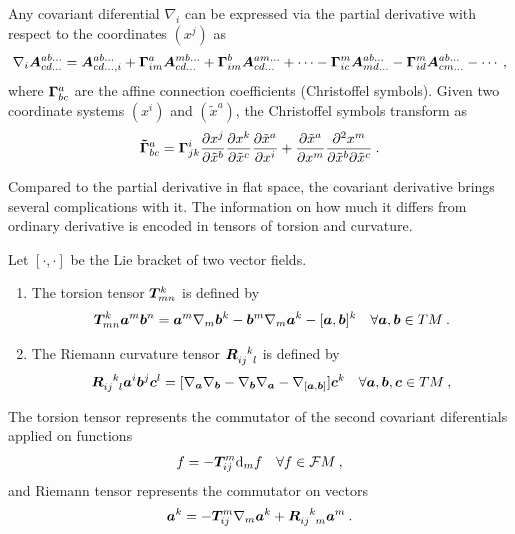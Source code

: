 Any covariant diferential $\nabla_i$ can be expressed via the partial derivative with respect to the coordinates $(x^j)$ as
\begin{align}
    \nabla_i \boldsymbol{A}^{ab \dots}_{cd \dots} = \boldsymbol{A}^{ab \dots}_{cd \dots, i} + \boldsymbol{\Gamma}^{a}_{im} \boldsymbol{A}^{mb \dots}_{cd \dots} + \boldsymbol{\Gamma}^{b}_{im} \boldsymbol{A}^{am \dots}_{cd \dots} + \cdots
    - \boldsymbol{\Gamma}^{m}_{ic} \boldsymbol{A}^{ab \dots}_{md \dots} - \boldsymbol{\Gamma}^{m}_{id} \boldsymbol{A}^{ab \dots}_{cm \dots} - \cdots \:,
\end{align}
where $\boldsymbol{\Gamma}^{a}_{bc}$ are the affine connection coefficients (Christoffel symbols). Given two coordinate systems $(x^i)$ and $(\tilde x^a)$, the Christoffel symbols transform as
\begin{align}
    \boldsymbol{\tilde\Gamma}^{a}_{bc} = \boldsymbol{\Gamma}^i_{jk} \frac{\partial x^j}{\partial \tilde  x^b} \frac{\partial x^k}{\partial \tilde x^c}  \frac{\partial \tilde x^a}{\partial x^i} + \frac{\partial \tilde x^a}{\partial x^m} \frac{\partial^2 x^m}{\partial \tilde x^b \partial \tilde x^c} \:.
\end{align}

Compared to the partial derivative in flat space, the covariant derivative brings several complications with it. The information on how much it differs from ordinary derivative is encoded in tensors of torsion and curvature. 

\begin{definition}
    Let $[\cdot,\cdot]$ be the Lie bracket of two vector fields.

    \begin{enumerate}
        \item The torsion tensor $\boldsymbol{T}^{k}_{mn}$ is defined by
        \begin{align}
            \boldsymbol{T}^k_{mn} \boldsymbol{a}^m \boldsymbol{b}^n = \boldsymbol{a}^m \nabla_m \boldsymbol{b}^k - \boldsymbol{b}^m \nabla_m \boldsymbol{a}^k - [\boldsymbol{a}, \boldsymbol{b}]^k \quad \forall \boldsymbol{a}, \boldsymbol{b} \in TM \:.
        \end{align}
        \item The Riemann curvature tensor $\vc R\indices{_i_j^k_l}$ is defined by
        \begin{align}
            \vc R\indices{_i_j^k_l} \vc a^i \vc b^j \vc c^l = [\nabla_{\vc a} \nabla_{\vc b} - \nabla_{\vc b} \nabla_{\vc a} - \nabla_{[\vc a, \vc b]}] \vc c^k \quad \forall \vc a, \vc b, \vc c \in TM \:,
        \end{align}
    \end{enumerate}
\end{definition}


The torsion tensor represents the commutator of the second covariant diferentials applied on functions
\begin{align}
    [\nabla_i \nabla_j - \nabla_j \nabla_i] f = - \vc T^{m}_{ij} \D_m f \quad \forall f \in \mathcal F M \:,
\end{align}
and Riemann tensor represents the commutator on vectors
\begin{align}
    [\nabla_i \nabla_j - \nabla_j \nabla_i] \vc a^k =  - \vc T_{ij}^m \nabla_m \vc a^k + \vc R\indices{_i_j^k_m} \vc a^m \:. 
\end{align}

